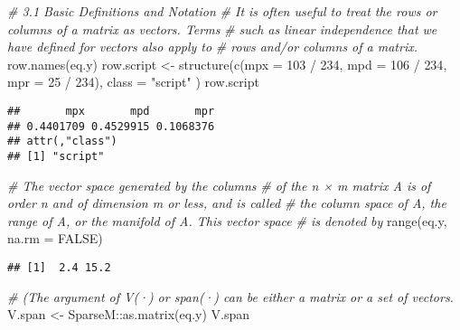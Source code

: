 \documentclass[
]{article}
\newenvironment{Shaded}{\begin{snugshade}}{\end{snugshade}}
\newcommand{\AttributeTok}[1]{\textcolor[rgb]{0.77,0.63,0.00}{#1}}
\newcommand{\CommentTok}[1]{\textcolor[rgb]{0.56,0.35,0.01}{\textit{#1}}}
\newcommand{\ConstantTok}[1]{\textcolor[rgb]{0.00,0.00,0.00}{#1}}
\newcommand{\DecValTok}[1]{\textcolor[rgb]{0.00,0.00,0.81}{#1}}
\newcommand{\FunctionTok}[1]{\textcolor[rgb]{0.00,0.00,0.00}{#1}}
\newcommand{\NormalTok}[1]{#1}
\newcommand{\OtherTok}[1]{\textcolor[rgb]{0.56,0.35,0.01}{#1}}
\newcommand{\SpecialCharTok}[1]{\textcolor[rgb]{0.00,0.00,0.00}{#1}}
\newcommand{\StringTok}[1]{\textcolor[rgb]{0.31,0.60,0.02}{#1}}
\begin{document}
\begin{Shaded}
\begin{Highlighting}[]
\CommentTok{\# 3.1 Basic Deﬁnitions and Notation}
\CommentTok{\# It is often useful to treat the rows or columns of a matrix as vectors. Terms}
\CommentTok{\# such as linear independence that we have deﬁned for vectors also apply to}
\CommentTok{\# rows and/or columns of a matrix.}
\FunctionTok{row.names}\NormalTok{(eq.y)}
\NormalTok{row.script }\OtherTok{\textless{}{-}} \FunctionTok{structure}\NormalTok{(}\FunctionTok{c}\NormalTok{(}\AttributeTok{mpx =} \DecValTok{103} \SpecialCharTok{/} \DecValTok{234}\NormalTok{, }\AttributeTok{mpd =} \DecValTok{106} \SpecialCharTok{/} \DecValTok{234}\NormalTok{, }\AttributeTok{mpr =} \DecValTok{25} \SpecialCharTok{/} \DecValTok{234}\NormalTok{),}
  \AttributeTok{class =} \StringTok{"script"}
\NormalTok{)}
\NormalTok{row.script}
\end{Highlighting}
\end{Shaded}

\begin{verbatim}
##       mpx       mpd       mpr 
## 0.4401709 0.4529915 0.1068376 
## attr(,"class")
## [1] "script"
\end{verbatim}

\begin{Shaded}
\begin{Highlighting}[]
\CommentTok{\# The vector space generated by the columns}
\CommentTok{\# of the n × m matrix A is of order n and of dimension m or less, and is called}
\CommentTok{\# the column space of A, the range of A, or the manifold of A. This vector space}
\CommentTok{\# is denoted by}
\FunctionTok{range}\NormalTok{(eq.y, }\AttributeTok{na.rm =} \ConstantTok{FALSE}\NormalTok{)}
\end{Highlighting}
\end{Shaded}

\begin{verbatim}
## [1]  2.4 15.2
\end{verbatim}

\begin{Shaded}
\begin{Highlighting}[]
\CommentTok{\# (The argument of V(·) or span(·) can be either a matrix or a set of vectors.}
\NormalTok{V.span }\OtherTok{\textless{}{-}}\NormalTok{ SparseM}\SpecialCharTok{::}\FunctionTok{as.matrix}\NormalTok{(eq.y)}
\NormalTok{V.span}
\end{Highlighting}
\end{Shaded}
\end{document}
